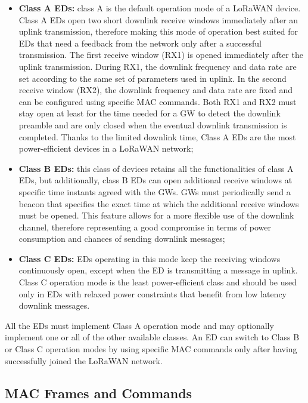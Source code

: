 \begin{itemize}
 \item \textbf{Class A \glspl{ED}:} class A is the default operation mode of a LoRaWAN device. Class A \glspl{ED} open two short downlink receive windows immediately after an uplink transmission, therefore making this mode of operation best suited for \glspl{ED} that need a feedback from the network only after a successful transmission. The first receive window (RX1) is opened immediately after the uplink transmission. During RX1, the downlink frequency and data rate are set according to the same set of parameters used in uplink. In the second receive window (RX2), the downlink frequency and data rate are fixed and can be configured using specific MAC commands. Both RX1 and RX2 must stay open at least for the time needed for a \gls{GW} to detect the downlink preamble and are only closed when the eventual downlink transmission is completed. Thanks to the limited downlink time, Class A \glspl{ED} are the most power-efficient devices in a LoRaWAN network;
 
\item \textbf{Class B \glspl{ED}:} this class of devices retains all the functionalities of class A \glspl{ED}, but  additionally, class B \glspl{ED} can open additional receive windows at specific time instants agreed with the \glspl{GW}. \glspl{GW} must periodically send a beacon that specifies the exact time at which the additional receive windows must be opened. This feature allows for a more flexible use of the downlink channel, therefore representing a good compromise in terms of power consumption and chances of sending downlink messages;

\item \textbf{Class C \glspl{ED}:} \glspl{ED} operating in this mode keep the receiving windows continuously open, except when the ED is transmitting a message in uplink. Class C operation mode is the least power-efficient class and should be used only in \glspl{ED} with relaxed power constraints that benefit from low latency downlink messages.

\end{itemize}

All the \glspl{ED} must implement Class A operation mode and may optionally implement one or all of the other available classes. An \gls{ED} can switch to Class B or Class C operation modes by using specific MAC commands only after having successfully joined the LoRaWAN network. 

\subsection{MAC Frames and Commands}

